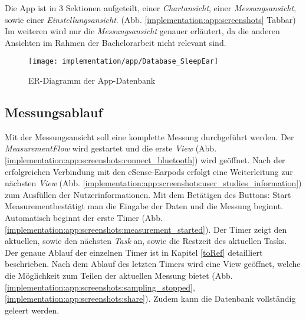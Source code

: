 Die App ist in 3 Sektionen aufgeteilt, einer \textit{Chartansicht}, einer \textit{Messungsansicht}, sowie einer \textit{Einstellungsansicht}. 
(Abb. \ref{implementation:app:screenshots} Tabbar)
Im weiteren wird nur die \textit{Messungsansicht} genauer erläutert, da die anderen Ansichten im Rahmen der Bachelorarbeit nicht relevant sind.

\begin{figure}[ht]
  \centering
  \texttt{[image: implementation/app/Database\_SleepEar]}
  \caption{ER-Diagramm der App-Datenbank}
  \label{implementation:app:erModel}
\end{figure}

\subsection{Messungsablauf}
\label{ch:Implementierung:app:measurement_procedure}
Mit der Messungsansicht soll eine komplette Messung durchgeführt werden.
Der \textit{MeasurementFlow} wird gestartet und die erste \textit{View} (Abb. \ref{implementation:app:screenshots:connect_bluetooth}) wird geöffnet.
Nach der erfolgreichen Verbindung mit den eSense-Earpods erfolgt eine Weiterleitung zur nächsten \textit{View} (Abb. \ref{implementation:app:screenshots:user_studies_information}) zum Ausfüllen der Nutzerinformationen. 
Mit dem Betätigen des Buttons: \glqq Start Measurement\grqq bestätigt man die Eingabe der Daten und die Messung beginnt.
Automatisch beginnt der erste Timer (Abb. \ref{implementation:app:screenshots:measurement_started}).
Der Timer zeigt den aktuellen, sowie den nächsten \textit{Task} an, sowie die Restzeit des aktuellen Tasks.
Der genaue Ablauf der einzelnen Timer ist in Kapitel \ref{toRef}  detailliert beschrieben.
Nach dem Ablauf des letzten Timers wird eine View geöffnet, welche die Möglichkeit zum Teilen der aktuellen Messung bietet (Abb. \ref{implementation:app:screenshots:sampling_stopped}, \ref{implementation:app:screenshots:share}).
Zudem kann die Datenbank vollständig geleert werden.

